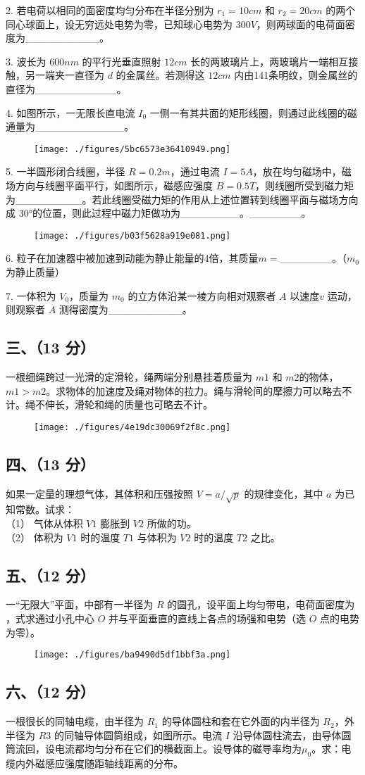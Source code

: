 2. 若电荷以相同的面密度均匀分布在半径分别为 $r_1=10cm$ 和 $r_2=20cm$ 的两个同心球面上，设无穷远处电势为零，已知球心电势为 $300V$，则两球面的电荷面密度为__________。

3. 波长为 $600nm$ 的平行光垂直照射 $12cm$ 长的两玻璃片上，两玻璃片一端相互接触，另一端夹一直径为 $d$ 的金属丝。若测得这 $12cm$ 内由141条明纹，则金属丝的直径为___________。

4. 如图所示，一无限长直电流 $I_0$ 一侧一有其共面的矩形线圈，则通过此线圈的磁通量为____________。
\begin{figure}[ht]
\centering
\texttt{[image: ./figures/5bc6573e36410949.png]}
\caption{} \label{fig_NJUD2_4}
\end{figure}
5. 一半圆形闭合线圈，半径 $R=0.2m$，通过电流 $I=5A$，放在均匀磁场中，磁场方向与线圈平面平行，如图所示，磁感应强度 $B=0.5T$，则线圈所受到磁力矩为_________。若此线圈受磁力矩的作用从上述位置转到线圈平面与磁场方向成 30°的位置，则此过程中磁力矩做功为________。_______。
\begin{figure}[ht]
\centering
\texttt{[image: ./figures/b03f5628a919e081.png]}
\caption{} \label{fig_NJUD2_5}
\end{figure}
6. 粒子在加速器中被加速到动能为静止能量的4倍，其质量$m=$_______。（$m_0$ 为静止质量）

7. 一体积为 $V_0$，质量为 $m_0$ 的立方体沿某一棱方向相对观察者 $A$ 以速度$v$ 运动，则观察者 $A$ 测得密度为__________。
\subsection{三、（13 分）}
一根细绳跨过一光滑的定滑轮，绳两端分别悬挂着质量为 $m1$ 和 $m2$的物体，$m1>m2$。求物体的加速度及绳对物体的拉力。绳与滑轮间的摩擦力可以略去不计。绳不伸长，滑轮和绳的质量也可略去不计。
\begin{figure}[ht]
\centering
\texttt{[image: ./figures/4e19dc30069f2f8c.png]}
\caption{} \label{fig_NJUD2_6}
\end{figure}
\subsection{四、（13 分）}
如果一定量的理想气体，其体积和压强按照 $V=a/\sqrt{p}$ 的规律变化，其中 $a$ 为已知常数。试求：\\
（1） 气体从体积 $V1$ 膨胀到 $V2$ 所做的功。\\
（2） 体积为 $V1$ 时的温度 $T1$ 与体积为 $V2$ 时的温度 $T2$ 之比。
\subsection{五、（12 分）}
一“无限大”平面，中部有一半径为 $R$ 的圆孔，设平面上均匀带电，电荷面密度为 ，式求通过小孔中心 $O$ 并与平面垂直的直线上各点的场强和电势（选 $O$ 点的电势为零）。
\begin{figure}[ht]
\centering
\texttt{[image: ./figures/ba9490d5df1bbf3a.png]}
\caption{} \label{fig_NJUD2_7}
\end{figure}
\subsection{六、（12 分）}
一根很长的同轴电缆，由半径为 $R_1$ 的导体圆柱和套在它外面的内半径为 $R_2$，外半径为 $R3$ 的同轴导体圆筒组成，如图所示。电流 $I$ 沿导体圆柱流去，由导体圆筒流回，设电流都均匀分布在它们的横截面上。设导体的磁导率均为$\mu_0$。求：电缆内外磁感应强度随距轴线距离的分布。